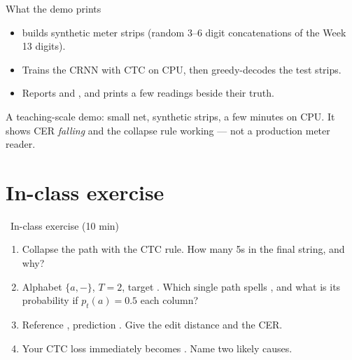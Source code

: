 \documentclass[10pt,aspectratio=169]{beamer}
\begin{document}
\begin{frame}{What the demo prints}
  \begin{itemize}
    \item {} builds synthetic meter strips (random 3--6 digit concatenations of the Week 13 digits).
    \item Trains the CRNN with CTC on CPU, then greedy-decodes the test strips.
    \item Reports  and , and prints a few readings beside their truth.
  \end{itemize}
  \begin{goodbox}
    A teaching-scale demo: small net, synthetic strips, a few minutes on CPU. It shows CER \emph{falling}
    and the collapse rule working --- not a production meter reader.
  \end{goodbox}
\end{frame}

\section{In-class exercise}

\begin{frame}{\faPen~In-class exercise (10 min)}
  \begin{infobox}
  \end{infobox}
  \begin{enumerate}
    \item Collapse the path  with the CTC rule. How many 5s in the final string, and why?
    \item Alphabet $\{a,-\}$, $T{=}2$, target . Which single path spells , and what is its probability if $p_t(a){=}0.5$ each column?
    \item Reference , prediction . Give the edit distance and the CER.
    \item Your CTC loss immediately becomes . Name two likely causes.
  \end{enumerate}
\end{frame}
\end{document}
